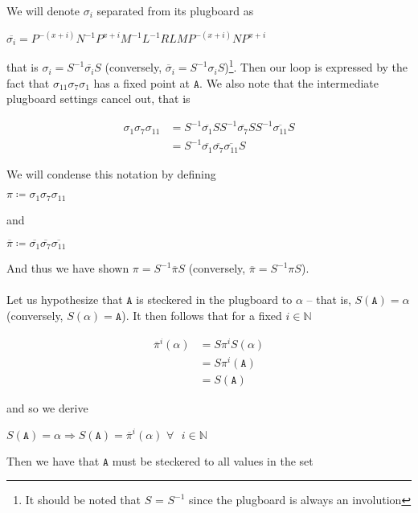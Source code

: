 We will denote $\sigma_i$ separated from its plugboard as
\begin{center}
	$\overline{\sigma_i} =
		P^{-(x+i)}N^{-1}P^{x+i}M^{-1}L^{-1}RLMP^{-(x+i)}NP^{x+i}$
\end{center}
\noindent that is $\sigma_i = S^{-1}\overline{\sigma_i}S$
(conversely, $\overline\sigma_i = S^{-1}\sigma_iS$)\footnote{It
	should be noted that $S$ = $S^{-1}$ since the plugboard is always an
	involution}.
Then our loop is expressed by the fact that
$\sigma_{11}\sigma_7\sigma_1$ has a fixed point at $\texttt{A}$.
We also note that the intermediate plugboard settings cancel out, that is
\begin{center}
	\begin{align*}
		\sigma_{1}\sigma_7\sigma_{11} & =
		S^{-1}\overline{\sigma_{1}}SS^{-1}\overline{\sigma_7}SS^{-1}\overline{\sigma_{11}}S
		\\&= S^{-1}
		\overline{\sigma_{1}}\overline{\sigma_7}\overline{\sigma_{11}}
		S
	\end{align*}
\end{center}
We will condense this notation by defining
\begin{center}
	$\pi \coloneq \sigma_{1}\sigma_7\sigma_{11}$
\end{center}
and
\begin{center}
	$\overline{\pi} \coloneq
		\overline{\sigma_{1}}\overline{\sigma_7}\overline{\sigma_{11}}$
\end{center}
And thus we have shown $\pi = S^{-1}\overline{\pi}S$ (conversely,
$\overline\pi = S^{-1}\pi S$).
\\\\Let us hypothesize that $\texttt{A}$ is steckered in the plugboard to
$\alpha$ -- that is, $S(\texttt{A}) = \alpha$ (conversely, $S(\alpha)
	= \texttt{A}$).
It then follows that for a fixed $i\in\mathbb{N}$
\begin{center}
	\begin{align*}
		\overline{\pi}^i(\alpha) & = S\pi^i S(\alpha)
		\\&= S \pi^i(\texttt{A})
		\\&= S(\texttt{A})
	\end{align*}
\end{center}
and so we derive
\begin{center}
	$S(\texttt{A}) = \alpha \Rightarrow S(\texttt{A}) =
		\overline{\pi}^i(\alpha)\text{
		}\forall\text{ }i\in\mathbb{N}$
\end{center}
Then we have that $\texttt{A}$ must be steckered to all values in the set
